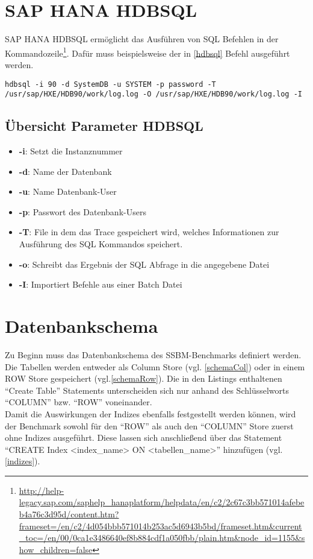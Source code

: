 \section{SAP HANA HDBSQL}
SAP HANA HDBSQL ermöglicht das Ausführen von SQL Befehlen in der Kommandozeile\footnote{\url{http://help-legacy.sap.com/saphelp_hanaplatform/helpdata/en/c2/2c67c3bb571014afebeb4a76c3d95d/content.htm?frameset=/en/c2/4d054bbb571014b253ac5d6943b5bd/frameset.htm&current_toc=/en/00/0ca1e3486640ef8b884cdf1a050fbb/plain.htm&node_id=1155&show_children=false}}. Dafür muss beispielsweise der in \autoref{hdbsql} Befehl ausgeführt werden.
\begin{lstlisting}[label=hdbsql, caption={HDBSQL Befehl}]
hdbsql -i 90 -d SystemDB -u SYSTEM -p password -T /usr/sap/HXE/HDB90/work/log.log -O /usr/sap/HXE/HDB90/work/log.log -I
\end{lstlisting}
\subsection{Übersicht Parameter HDBSQL}
\begin{itemize}
\item \textbf{-i}: Setzt die Instanznummer
\item \textbf{-d}: Name der Datenbank
\item \textbf{-u}: Name Datenbank-User
\item \textbf{-p}: Passwort des Datenbank-Users
\item \textbf{-T}: File in dem das Trace gespeichert wird, welches Informationen zur Ausführung des SQL Kommandos speichert.
\item \textbf{-o}: Schreibt das Ergebnis der SQL Abfrage in die angegebene Datei
\item \textbf{-I}: Importiert Befehle aus einer Batch Datei
\end{itemize}




\section{Datenbankschema}
Zu Beginn muss das Datenbankschema des SSBM-Benchmarks definiert werden. Die Tabellen werden entweder als Column Store (vgl. \autoref{schemaCol})  oder in einem ROW Store gespeichert (vgl.\autoref{schemaRow}). Die in den Listings enthaltenen \enquote{Create Table} Statements unterscheiden sich nur anhand des Schlüsselworts \enquote{COLUMN} bzw. \enquote{ROW} voneinander. 
\\Damit die Auswirkungen der Indizes ebenfalls festgestellt werden können, wird der Benchmark sowohl für den \enquote{ROW} als auch den \enquote{COLUMN} Store zuerst ohne Indizes ausgeführt. Diese lassen sich anschließend über das Statement \enquote{CREATE Index <index\_name> ON <tabellen\_name>} hinzufügen (vgl. \autoref{indizes}).

